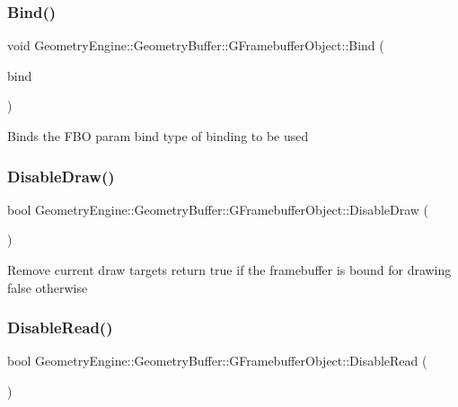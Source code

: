 \subsubsection{\texorpdfstring{Bind()}{Bind()}}
{\footnotesize\ttfamily void Geometry\+Engine\+::\+Geometry\+Buffer\+::\+G\+Framebuffer\+Object\+::\+Bind (\begin{DoxyParamCaption}\item[{G\+\_\+\+F\+R\+A\+M\+E\+B\+U\+F\+F\+E\+R\+\_\+\+B\+I\+N\+DS}]{bind }\end{DoxyParamCaption})}

Binds the F\+BO param bind type of binding to be used \mbox{\label{class_geometry_engine_1_1_geometry_buffer_1_1_g_framebuffer_object_a3eb30c7714c5c3f3c2ec8f85a2ec948c}} 
\subsubsection{\texorpdfstring{DisableDraw()}{DisableDraw()}}
{\footnotesize\ttfamily bool Geometry\+Engine\+::\+Geometry\+Buffer\+::\+G\+Framebuffer\+Object\+::\+Disable\+Draw (\begin{DoxyParamCaption}{ }\end{DoxyParamCaption})}

Remove current draw targets return true if the framebuffer is bound for drawing false otherwise \mbox{\label{class_geometry_engine_1_1_geometry_buffer_1_1_g_framebuffer_object_a916dea3e3d84f0c3126f853c91de64ed}} 
\subsubsection{\texorpdfstring{DisableRead()}{DisableRead()}}
{\footnotesize\ttfamily bool Geometry\+Engine\+::\+Geometry\+Buffer\+::\+G\+Framebuffer\+Object\+::\+Disable\+Read (\begin{DoxyParamCaption}{ }\end{DoxyParamCaption})}


